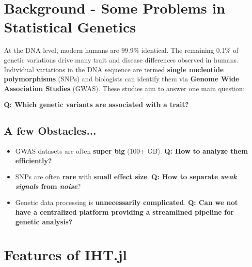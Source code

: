 \documentclass[a0,portrait]{a0poster}
\begin{document}


\begin{multicols}{2} %

\color{Navy} %
\section*{Background - Some Problems in Statistical Genetics}

\color{Black} %

\raggedright
At the DNA level, modern humans are 99.9\% identical. The remaining 0.1\% of genetic variations drive many trait and disease differences observed in humans. Individual variations in the DNA sequence are termed \textbf{single nucleotide polymorphisms} (SNPs) and biologists can identify them via \textbf{Genome Wide Association Studies} (GWAS). These studies aim to answer one main question:

\vspace{1cm}
\centering \Large \textbf{Q: Which genetic variants are associated with a trait?}

\raggedright \normalsize
\subsection*{A few Obstacles...}
\begin{itemize}
	\item GWAS datasets are often \textbf{super big} (100+ GB). \textbf{\color{Green} Q: How to analyze them efficiently? } \color{black}
	\item SNPs are often \textbf{rare} with \textbf{small effect size}. \color{Green} \textbf{Q: How to separate \textit{weak signals} from \textit{noise}}?  \color{black}
	\item Genetic data processing is \textbf{unnecessarily complicated}.\color{Green} \textbf{ Q: Can we not have a centralized platform providing a streamlined pipeline for genetic analysis?} \color{black}
\end{itemize}

\color{Navy} %

\section*{Features of IHT.jl}


\end{multicols}
\end{document}
